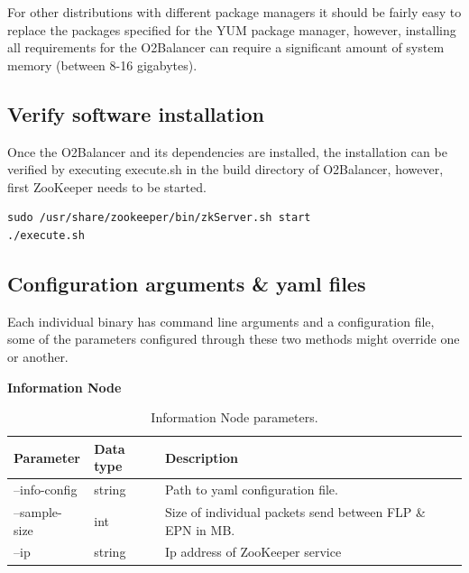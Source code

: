\documentclass[]{article}
\begin{document}
For other distributions with different package managers it should be fairly easy to replace the packages specified for the YUM package manager, however, installing all requirements for the O2Balancer can require a significant amount of system memory (between 8-16 gigabytes).

\subsection*{Verify software installation}
Once the O2Balancer and its dependencies are installed, the installation can be verified by executing execute.sh in the build directory of O2Balancer, however, first ZooKeeper needs to be started.

\begin{lstlisting}
sudo /usr/share/zookeeper/bin/zkServer.sh start
./execute.sh
\end{lstlisting}

\subsection*{Configuration arguments \& yaml files}
Each individual binary has command line arguments and a configuration file, some of the parameters configured through these two methods might override one or another.

\begin{table}[H]
	\textbf{Information Node}	
	\begin{center}	
		\begin{tabularx}{\textwidth}{ | l | l | X | }
			\hline
			\textbf{Parameter} & \textbf{Data type} & \textbf{Description} \\ \hline
					
			--info-config & string & Path to yaml configuration file. \\ \hline
			--sample-size & int & Size of individual packets send between FLP \& EPN in MB. \\ \hline
			--ip & string & Ip address of ZooKeeper service \\ \hline
		\end{tabularx}
		\caption{Information Node parameters.}
		\label{tab:informationnode}
	\end{center}
\end{table}
\end{document}
